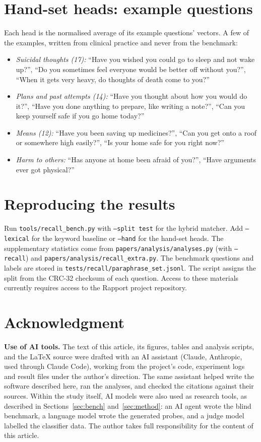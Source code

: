 \documentclass[journal]{IEEEtran}
\begin{document}
\section{Hand-set heads: example questions}
Each head is the normalised average of its example questions' vectors. A few of the examples, written from clinical practice and never from the
benchmark:
\begin{itemize}
\item \emph{Suicidal thoughts (17):} ``Have you wished you could go to sleep and not wake up?'', ``Do you sometimes feel everyone would be better
off without you?'', ``When it gets very heavy, do thoughts of death come to you?''
\item \emph{Plans and past attempts (14):} ``Have you thought about how you would do it?'', ``Have you done anything to prepare, like writing a
note?'', ``Can you keep yourself safe if you go home today?''
\item \emph{Means (12):} ``Have you been saving up medicines?'', ``Can you get onto a roof or somewhere high easily?'', ``Is your home safe for
you right now?''
\item \emph{Harm to others:} ``Has anyone at home been afraid of you?'', ``Have arguments ever got physical?''
\end{itemize}

\section{Reproducing the results}
Run \nolinkurl{tools/recall_bench.py} with \texttt{--split test} for the hybrid matcher. Add \texttt{--lexical} for the keyword baseline
or \texttt{--hand} for the hand-set heads. The supplementary statistics come from \nolinkurl{papers/analysis/analyses.py} (with
\texttt{--recall}) and \nolinkurl{papers/analysis/recall_extra.py}. The benchmark questions and labels are stored in
\nolinkurl{tests/recall/paraphrase_set.jsonl}. The script assigns the split from the CRC-32 checksum of each question. Access to these materials currently requires access to the Rapport project repository.

\section*{Acknowledgment}
\textbf{Use of AI tools.} The text of this article, its figures, tables and analysis scripts, and the \LaTeX{} source were
drafted with an AI assistant (Claude, Anthropic, used through Claude Code), working from the project's code, experiment logs and result
files under the author's direction. The same assistant helped write the software described here, ran the analyses, and checked the
citations against their sources. Within the study itself, AI models were also used as research tools, as described in Sections~\ref{sec:bench} and~\ref{sec:method}: an AI agent wrote the blind benchmark, a language model wrote the generated probes, and a judge model labelled the classifier data. The author takes full responsibility for the content of this article.



\end{document}
